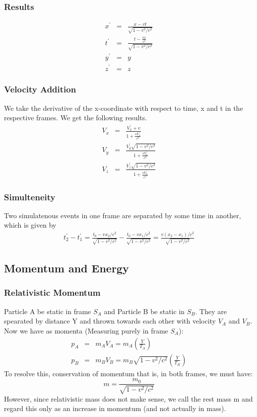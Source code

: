 \subsubsection{Results}
\begin{eqnarray}
    x^\prime &=& \frac{x - vt}{\sqrt{1 - v^2/c^2}} \\
    t^\prime &=& \frac{t - \frac{vx}{c^2}}{\sqrt{1 - v^2/c^2}} \\
    y^\prime &=& y \\
    z^\prime &=& z
\end{eqnarray}

\subsubsection{Velocity Addition}
We take the derivative of the x-coordinate with respect to time, x and t in the respective frames. We get the following results.
\begin{eqnarray}
    V_x &=& \frac{V_x^\prime + v}{1 + \frac{v V_x^\prime}{c^2}} \\
    V_y &=& \frac{V_y^\prime \sqrt{1-v^2/c^2}}{1 + \frac{v V_x^\prime}{c^2}} \\
    V_z &=& \frac{V_z^\prime \sqrt{1-v^2/c^2}}{1 + \frac{v V_x^\prime}{c^2}}
\end{eqnarray}

\subsubsection{Simulteneity}
Two simulatenous events in one frame are separated by some time in another, which is given by
\begin{eqnarray}
    t_2^\prime - t_1^\prime = \frac{t_0 - v x_2 / c^2}{\sqrt{1 - v^2/c^2}} - \frac{t_0 - v x_1 / c^2}{\sqrt{1 - v^2/c^2}} = \frac{v (x_2 - x_1) / c^2}{\sqrt{1 - v^2/c^2}}
\end{eqnarray}


\subsection{Momentum and Energy}

\subsubsection{Relativistic Momentum}
Particle A be static in frame $S_A$ and Particle B be static in $S_B$. They are spearated by distance Y and thrown towards each other with velocity $V_A$ and $V_B$. Now we have as momenta (Measuring purely in frame $S_A$):
\begin{eqnarray*}
    p_A &=& m_A V_A = m_A (\frac{Y}{T_A}) \\
    p_B &=& m_B V_B = m_B \sqrt{1 - v^2/c^2}(\frac{Y}{T_B})
\end{eqnarray*}
To resolve this, conservation of momentum that is, in both frames, we must have:
\begin{equation}
    m = \frac{m_0}{\sqrt{1 - v^2/c^2}}
\end{equation}
However, since relativistic mass does not make sense, we call the rest mass m and regard this only as an increase in momentum (and not actually in mass).

